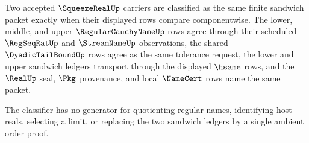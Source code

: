 \begin{definition}
\label{def:squeeze-real-classifier}
Two accepted $\SqueezeRealUp$ carriers are classified as the same finite sandwich packet exactly when their displayed rows compare componentwise. The lower, middle, and upper $\RegularCauchyNameUp$ rows agree through their scheduled $\RegSeqRatUp$ and $\StreamNameUp$ observations, the shared $\DyadicTailBoundUp$ rows agree as the same tolerance request, the lower and upper sandwich ledgers transport through the displayed $\hsame$ rows, and the $\RealUp$ seal, $\Pkg$ provenance, and local $\NameCert$ rows name the same packet.

The classifier has no generator for quotienting regular names, identifying host reals, selecting a limit, or replacing the two sandwich ledgers by a single ambient order proof.
\end{definition}

